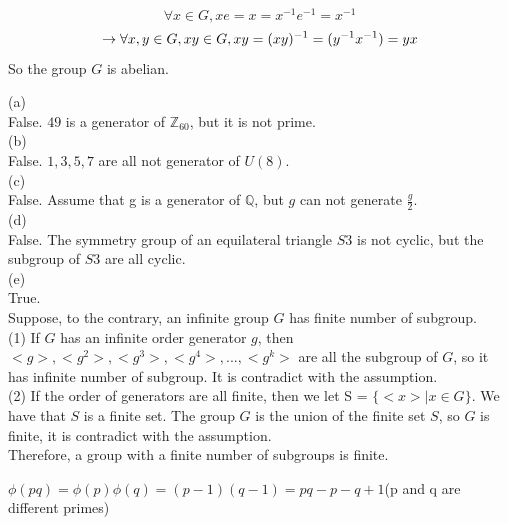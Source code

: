 \documentclass[a4paper, justified]{tufte-handout}
\begin{document}
\begin{problem}[TJ 3-51]
\end{problem}

\begin{solution}
\[
\forall x\in G, xe=x=x^{-1}e^{-1}=x^{-1}
\]
\[
\to \forall x,y\in G, xy\in G, xy=(xy)^{-1}=(y^{-1}x^{-1})=yx\\
\]
So the group $G$ is abelian.
\end{solution}

\begin{problem}[TJ 4-1]
\end{problem}

\begin{solution}
(a)\\
False. $49$ is a generator of $\mathbb{Z}_{60}$, but it is not prime.\\
(b)\\
False. $1,3,5,7$ are all not generator of $U(8)$.\\
(c)\\
False. Assume that g is a generator of $\mathbb{Q}$, but $g$ can not generate $\frac{g}{2}$.\\
(d)\\
False. The symmetry group of an equilateral triangle $S3$ is not cyclic, but the subgroup of $S3$ are all cyclic.\\
(e)\\
True. \\
Suppose, to the contrary, an infinite group $G$ has finite number of subgroup.\\
(1) If $G$ has an infinite order  generator $g$, then $<g>, <g^2>, <g^3>, <g^4>,...,<g^k>$ are all the subgroup of $G$, so it has infinite number of subgroup. It is contradict with the assumption.\\
(2) If the order of generators are all finite, then we let S = $\{<x>|x\in G\}$. We have that $S$ is a finite set. The group $G$ is the union of the finite set $S$, so $G$ is finite, it is contradict with the assumption.\\
Therefore, a group with a finite number of subgroups is finite.
\end{solution}

\begin{problem}[TJ 4-24]
\end{problem}

\begin{solution}
$\phi(pq)=\phi(p)\phi(q)=(p-1)(q-1)=pq-p-q+1$(p and q are different primes)
\end{solution}
\end{document}
